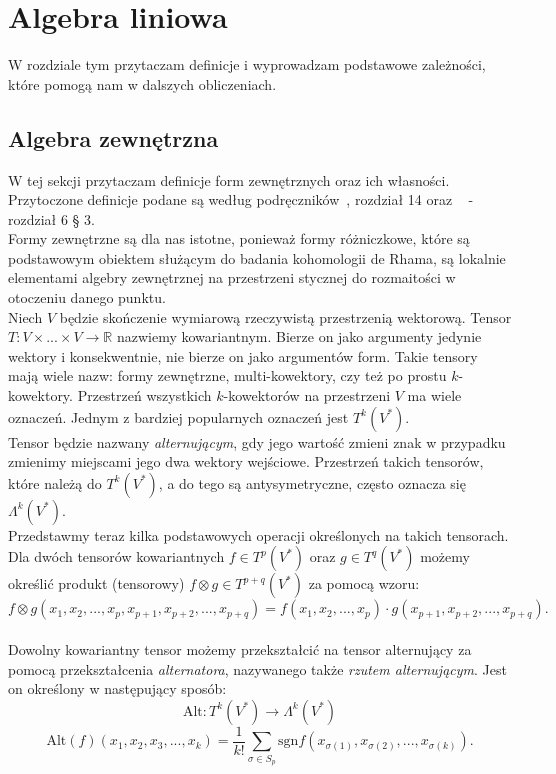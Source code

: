 \documentclass[licencjacka]{pracamgr}
\theoremstyle{definition}
\theoremstyle{definition}
\theoremstyle{plain}
\theoremstyle{plain}
\theoremstyle{plain}
\theoremstyle{plain}
\begin{document}
\chapter{Algebra liniowa}
W rozdziale tym przytaczam definicje i wyprowadzam podstawowe zależności, które
pomogą nam w dalszych obliczeniach. \\

\section{Algebra zewnętrzna}
W tej sekcji przytaczam definicje form zewnętrznych oraz ich własności. 
 Przytoczone
definicje podane są według podręczników~\cite{lee}, rozdział 14 oraz
~\cite{kostrikin} - rozdział 6 § 3. \\

Formy zewnętrzne są dla nas istotne, ponieważ formy różniczkowe, które 
są podstawowym obiektem służącym do badania kohomologii de Rhama, 
są lokalnie elementami algebry zewnętrznej na przestrzeni stycznej
do rozmaitości w otoczeniu danego punktu. \\

Niech $V$ będzie skończenie wymiarową rzeczywistą przestrzenią wektorową.
Tensor $T:V \times ... \times V \rightarrow \mathbb{R}$ nazwiemy kowariantnym.
Bierze on jako argumenty jedynie wektory i konsekwentnie, nie bierze on jako
argumentów form.  Takie tensory mają wiele nazw: formy zewnętrzne,
multi-kowektory, czy też po prostu $k$-kowektory.  Przestrzeń wszystkich
$k$-kowektorów na przestrzeni $V$ ma wiele oznaczeń.  Jednym z bardziej
popularnych oznaczeń jest $T^k (V^\ast)$. \\

Tensor będzie nazwany \emph{alternującym}, gdy jego wartość zmieni znak w
przypadku zmienimy miejscami jego dwa wektory wejściowe.  Przestrzeń takich
tensorów, które należą do $T^k (V^\ast)$, a do tego są antysymetryczne, często
oznacza się $\Lambda^k (V^\ast)$. \\

Przedstawmy teraz kilka podstawowych operacji określonych na takich tensorach.
Dla dwóch tensorów kowariantnych $f \in T^p(V^\ast) $ oraz $g \in T^q(V^\ast) $
możemy określić produkt (tensorowy) $f \otimes g \in T^{p+q}(V^\ast) $ za
pomocą wzoru:
\[
  f \otimes g(x_1, x_2, ..., x_p, x_{p+1}, x_{p+2}, ... ,x_{p+q}) =
  f(x_1, x_2, ... , x_p) \cdot g(x_{p+1}, x_{p+2}, ... , x_{p+q}).
\] \\

Dowolny kowariantny tensor możemy
przekształcić na tensor alternujący za pomocą przekształcenia
\emph{alternatora}, nazywanego także \emph{rzutem alternującym}.
Jest on określony w następujący sposób:
\[
\text{Alt}:T^k (V^\ast) \rightarrow  \Lambda^k (V^\ast)
\]
\[
\text{Alt}(f)(x_1, x_2, x_3, ..., x_k) = \frac{1}{k!}
  \sum_{\sigma \in S_p}
     \text{sgn} f(x_{\sigma(1)}, x_{\sigma(2)}, ..., x_{\sigma(k)}).
\] \\
\end{document}
